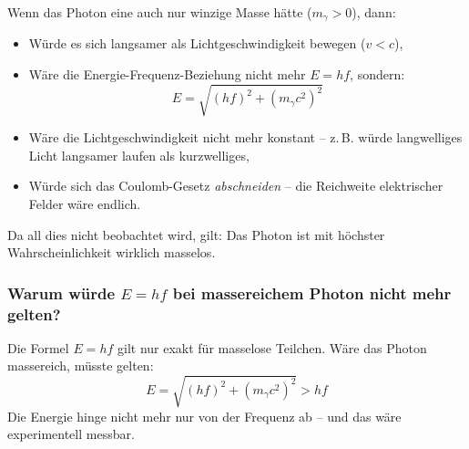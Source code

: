 \begin{tcolorbox}[hypobox, title={Was wäre wenn, wenn das Photon eine Masse hätte? }]
	\label{box:was wäre wenn}
	Wenn das Photon eine auch nur winzige Masse hätte ($m_\gamma > 0$), dann:
	\begin{itemize}
		\item Würde es sich langsamer als Lichtgeschwindigkeit bewegen ($v < c$),
		\item Wäre die Energie-Frequenz-Beziehung nicht mehr $E = hf$, sondern:
		\begin{equation*}
			E = \sqrt{(hf)^2 + (m_\gamma c^2)^2}
		\end{equation*}
		\item Wäre die Lichtgeschwindigkeit nicht mehr konstant – z.\,B. würde langwelliges Licht langsamer laufen als kurzwelliges,
		\item Würde sich das Coulomb-Gesetz \textit{abschneiden} – die Reichweite elektrischer Felder wäre endlich.
	\end{itemize}
	Da all dies nicht beobachtet wird, gilt: Das Photon ist mit höchster Wahrscheinlichkeit wirklich masselos.
\end{tcolorbox}
\medskip

\subsubsection{Warum w\"urde \( E = h f \) bei massereichem Photon nicht mehr gelten?}

Die Formel $E = hf$ gilt nur exakt f\"ur masselose Teilchen. W\"are das Photon massereich, m\"usste gelten:
\begin{equation}
	E = \sqrt{(hf)^2 + (m_\gamma c^2)^2} > hf
\end{equation}
Die Energie hinge nicht mehr nur von der Frequenz ab -- und das w\"are experimentell messbar.

